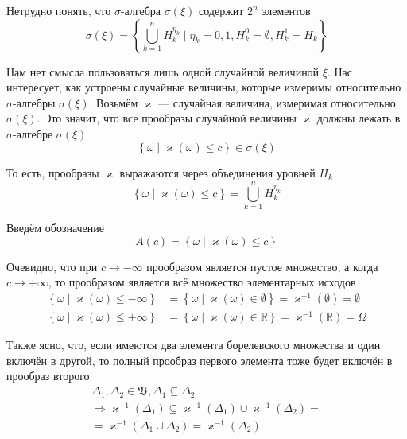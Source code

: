 Нетрудно понять,
что $\sigma$-алгебра $\sigma\left( \xi \right)$ содержит $2^n$ элементов
$$\sigma\left( \xi \right) = \left\{ \bigcup_{k=1}^n H_k^{\eta_k}
    \mid \eta_k = \overline{0,1}, H_k^0 = \emptyset, H_k^1 = H_k \right\}$$

Нам нет смысла пользоваться лишь одной случайной величиной $\xi$.
Нас интересует, как устроены случайные величины,
которые измеримы относительно $\sigma$-алгебры $\sigma\left( \xi \right)$.
Возьмём $\varkappa$ --- случайная величина,
измеримая относительно $\sigma\left( \xi \right)$.
Это значит, что все прообразы случайной величины $\varkappa$ должны лежать в
$\sigma$-алгебре $\sigma\left( \xi \right)$
$$\left\{ \omega \mid \varkappa\left( \omega \right) \le c \right\}
    \in \sigma\left( \xi \right)$$

То есть, прообразы $\varkappa$ выражаются через объединения уровней $H_k$
$$\left\{ \omega \mid \varkappa\left( \omega \right) \le c \right\}
    = \bigcup_{k=1}^n H_k^{\eta_k}$$

Введём обозначение
$$A\left( c \right)
    = \left\{ \omega \mid \varkappa\left( \omega \right) \le c \right\}$$

Очевидно, что при $c\to-\infty$ прообразом является пустое множество,
а когда $c\to+\infty$, то прообразом является всё множество элементарных исходов
\begin{align*}
    \left\{ \omega \mid \varkappa\left( \omega \right) \le -\infty \right\}
        &= \left\{ \omega \mid \varkappa\left(\omega\right)\in\emptyset \right\}
        = \varkappa^{-1}\left( \emptyset \right)
        = \emptyset \\
    \left\{ \omega \mid \varkappa\left( \omega \right) \le +\infty \right\}
        &= \left\{ \omega \mid\varkappa\left(\omega\right)\in\mathbb{R} \right\}
        = \varkappa^{-1}\left( \mathbb{R} \right)
        = \Omega
\end{align*}

Также ясно,
что, если имеются два элемента борелевского множества и один включён в другой,
то полный прообраз первого элемента тоже будет включён в прообраз второго
\begin{align*}
    \Delta_1, \Delta_2 \in \mathfrak{B},
    \Delta_1 \subseteq \Delta_2 \\
    \Rightarrow \varkappa^{-1}\left( \Delta_1 \right)
        \subseteq \varkappa^{-1}\left( \Delta_1 \right)
            \cup \varkappa^{-1}\left( \Delta_2 \right) = \\
        = \varkappa^{-1}\left( \Delta_1 \cup \Delta_2 \right)
        = \varkappa^{-1}\left( \Delta_2 \right)
\end{align*}

